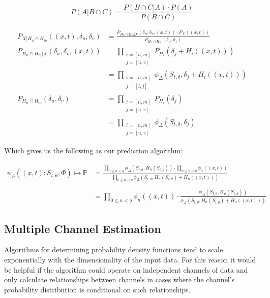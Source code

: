 \documentclass[10pt]{article}
\begin{document}
\[ P(A|B \cap C) = \frac{ P(B \cap C|A) \cdot P(A) }{ P(B \cap C) } \]

\begin{align}
P_{X|H_n \cap H_m} \left( (x,t), \delta_u, \delta_v \right) &=
	\frac { P_{H_n \cap H_m | X} \left( \delta_u, \delta_v, (x,t) \right) \cdot P_X \left( (x,t) \right) } { P_{H_n \cap H_m} \left( \delta_u, \delta_v \right) } \nonumber \\
P_{H_n \cap H_m | X} \left( \delta_u, \delta_v, (x,t) \right) &= 
	\prod_{\substack{i=[n,m] \\ j=[u,v]}} P_{H_i} \left( \delta_j + H_i((x,t)) \right) \nonumber 
\\
&= \prod_{\substack{i=[n,m]\\j=[i,j]}} \phi_\Delta(S_{t,\theta},\delta_j + H_i((x,t)) ) \\
P_{H_n \cap H_m} \left( \delta_u, \delta_v \right) &= 
	\prod_{\substack{i=[n,m]\\j=[u,v]}} P_{H_i} \left( \delta_j \right) \nonumber 
\\
&= \prod_{\substack{i=[n,m]\\j=[u,v]}} \phi_\Delta(S_{t,\theta},\delta_j )
\end{align}

Which gives us the following as our prediction algorithm:

\begin{align}
\psi_P \left( (x,t) :S_{t,\theta}, \Phi \right) \mapsto \mathbb{P} 
	&= \frac{ \prod_{0 \le n < q} \phi_\Delta \left( S_{t,\theta}, H_n(S_{t,\theta}) \right) \cdot \prod_{0 \le n < q} \phi_n \left( (x,t) \right) }{ \prod_{0 \le n < q} \phi_\Delta(S_{t,\theta}, H_n(S_{t,\theta}) + H_n((x,t)) ) }  \nonumber \\
\nonumber \\
&= \prod_{0 \le n < q} \phi_n \left( (x,t) \right) \cdot \frac{ \phi_\Delta \left (S_{t,\theta}, H_n(S_{t,\theta}) \right) }{ \phi_\Delta \left( S_{t,\theta}, H_n(S_{t,\theta}) + H_n((x,t)) \right) }
\end{align}


\subsection{Multiple Channel Estimation}
Algorithms for determining probability density functions tend to scale exponentially with the dimensionality of the input data.  For this reason it would be helpful if the algorithm could operate on independent channels of data and only calculate relationships between channels in cases where the channel's probability distribution is conditional on such relationships.
\end{document}
